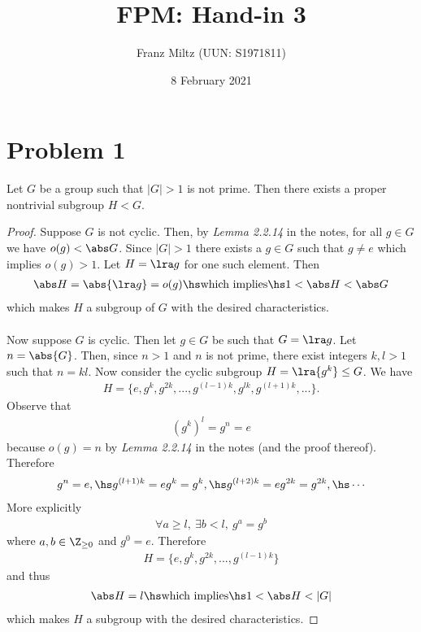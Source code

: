 \documentclass{article}
\begin{document}
\title{FPM: Hand-in 3}
\author{Franz Miltz (UUN: S1971811)}
\date{8 February 2021}
\maketitle

\section*{Problem 1}

\begin{claim*}
    Let $G$ be a group such that $|G|>1$ is not prime. Then
    there exists a proper nontrivial subgroup $H<G$.
\end{claim*}

\begin{proof}
    Suppose $G$ is not cyclic. Then, by \emph{Lemma 2.2.14} in the notes,
    for all $g\in G$ we have $o(g)<\abs G$. Since $|G|>1$ there exists
    a $g\in G$ such that $g\not=e$ which implies $o(g)>1$.
    Let $H=\lra g$ for one such element. Then
    \begin{align*}
        \abs H = \abs{\lra g} = o(g) \hs\text{which implies}\hs 1 < \abs H < \abs G
    \end{align*}
    which makes $H$ a subgroup of $G$ with
    the desired characteristics.\\\\
    Now suppose $G$ is cyclic. Then let $g\in G$ be such that
    $G=\lra g$. Let $n=\abs{G}$. Then, since $n>1$ and $n$ is not prime,
    there exist integers $k,l>1$ such that $n=kl$.
    Now consider the cyclic subgroup $H=\lra{g^k}\leq G$. We have
    \begin{align*}
        H =\{e, g^k, g^{2k}, ..., g^{(l-1)k}, g^{lk}, g^{(l+1)k}, ...\}.
    \end{align*}
    Observe that
    \begin{align*}
        \left(g^k\right)^l = g^n = e
    \end{align*}
    because $o(g)=n$ by \emph{Lemma 2.2.14} in the notes (and the proof
    thereof). Therefore
    \begin{align*}
        g^n = e,\hs g^{(l+1)k} = eg^k = g^k, \hs g^{(l+2)k}=eg^{2k}=g^{2k},\hs \cdots
    \end{align*}
    More explicitly
    \begin{align*}
        \forall a \geq l,\: \exists b<l,\: g^a = g^b
    \end{align*}
    where $a,b\in\Z_{\geq 0}$ and $g^0 = e$. Therefore
    \begin{align*}
        H = \{e, g^k, g^{2k}, ..., g^{(l-1)k}\}
    \end{align*}
    and thus
    \begin{align*}
        \abs H = l \hs\text{which implies}\hs 1 < \abs H < |G|
    \end{align*}
    which makes $H$ a subgroup with the desired characteristics.
\end{proof}
\end{document}
